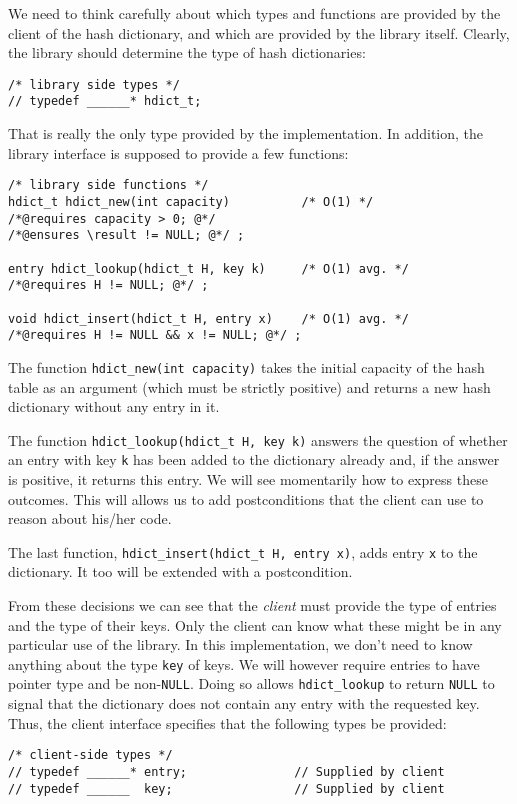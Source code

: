 We need to think carefully about which types and functions are
provided by the client of the hash dictionary, and which are provided
by the library itself.  Clearly, the library should determine the type
of hash dictionaries:
\begin{lstlisting}[language={[C0]C}]
/* library side types */
// typedef ______* hdict_t;
\end{lstlisting}
That is really the only type provided by the implementation.  In
addition, the library interface is supposed to provide a few
functions:
\begin{lstlisting}[language={[C0]C}]
/* library side functions */
hdict_t hdict_new(int capacity)          /* O(1) */
/*@requires capacity > 0; @*/
/*@ensures \result != NULL; @*/ ;

entry hdict_lookup(hdict_t H, key k)     /* O(1) avg. */
/*@requires H != NULL; @*/ ;

void hdict_insert(hdict_t H, entry x)    /* O(1) avg. */
/*@requires H != NULL && x != NULL; @*/ ;
\end{lstlisting}
The function \lstinline'hdict_new(int capacity)' takes the initial
capacity of the hash table as an argument (which must be strictly
positive) and returns a new hash dictionary without any entry in it.

The function \lstinline'hdict_lookup(hdict_t H, key k)' answers the
question of whether an entry with key \lstinline'k' has been added to
the dictionary already and, if the answer is positive, it returns this
entry.  We will see momentarily how to express these outcomes.  This
will allows us to add postconditions that the client can use to reason
about his/her code.

The last function, \lstinline'hdict_insert(hdict_t H, entry x)', adds
entry \lstinline'x' to the dictionary.  It too will be extended with a
postcondition.

\medskip

From these decisions we can see that the \emph{client} must provide
the type of entries and the type of their keys.  Only the client can
know what these might be in any particular use of the library. In this
implementation, we don't need to know anything about the type
\lstinline'key' of keys.  We will however require entries to have
pointer type and be non-\lstinline'NULL'.  Doing so allows
\lstinline'hdict_lookup' to return \lstinline'NULL' to signal that the
dictionary does not contain any entry with the requested key.  Thus, the
client interface specifies that the following types be provided:
\begin{lstlisting}[language={[C0]C}]
/* client-side types */
// typedef ______* entry;               // Supplied by client
// typedef ______  key;                 // Supplied by client
\end{lstlisting}

